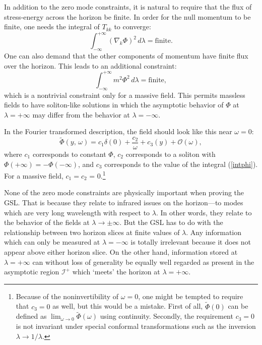 \documentclass[12pt]{article}
\begin{document}
In addition to the zero mode constraints, it is natural to require that the flux of stress-energy across the horizon be finite.  In order for the null momentum to be finite, one needs the integral of $T_{kk}$ to converge:
\begin{equation}
\int_{-\infty}^{+\infty} (\nabla_k \Phi)^2 \,d\lambda = \mathrm{finite}.
\end{equation}
One can also demand that the other components of momentum have finite flux over the horizon.  This leads to an additional constraint:
\begin{equation}\label{intphi}
\int_{-\infty}^{+\infty} m^2 \Phi^2 \,d\lambda = \mathrm{finite},
\end{equation}
which is a nontrivial constraint only for a massive field.  This permits massless fields to have soliton-like solutions in which the asymptotic behavior of $\Phi$ at $\lambda = +\infty$ may differ from the behavior at $\lambda = -\infty$.

In the Fourier transformed description, the field should look like this near $\omega = 0$:
\begin{equation}
\tilde{\Phi}(y,\,\omega) = c_1 \delta(0) + \frac{c_2}{\omega} + c_3(y) + \mathcal{O}(\omega),
\end{equation}
where $c_1$ corresponds to constant $\Phi$, $c_2$ corresponds to a soliton with $\Phi(+\infty) = -\Phi(-\infty)$, and $c_3$ corresponds to the value of the integral (\ref{intphi}).  For a massive field, $c_1 = c_2$ = 0.\footnote{Because of the noninvertibility of $\omega = 0$, one might be tempted to require that $c_3 = 0$ as well, but this would be a mistake.  First of all,
$\tilde{\Phi}(0)$ can be defined as $\lim_{\omega \to 0} \tilde{\Phi}(\omega)$ using continuity.  Secondly, the requirement $c_3 = 0$ is not invariant under special conformal transformations such as the inversion $\lambda \to 1/\lambda$.}

None of the zero mode constraints are physically important when proving the GSL.  That is because they relate to infrared issues on the horizon---to modes which are very long wavelength with respect to $\lambda$.  In other words, they relate to the behavior of the fields at $\lambda \to \pm \infty$.  But the GSL has to do with the relationship between two horizon slices at finite values of $\lambda$.  Any information which can only be measured at $\lambda = -\infty$ is totally irrelevant because it does not appear above either horizon slice.  On the other hand, information stored at $\lambda = +\infty$ can without loss of generality be equally well regarded as present in the asymptotic region $\mathcal{I}^+$ which `meets' the horizon at $\lambda = +\infty$.
\end{document}
